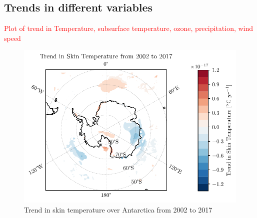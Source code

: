 \documentclass[../main.tex]{subfiles}
\begin{document}
\subsection{Trends in different variables}
\textcolor{red}{Plot of trend in Temperature, subsurface temperature, ozone, precipitation, wind speed}
\begin{figure}[!hbt]
    \centering
    \includegraphics{images/2021w5/chapter7/hres/trend_spatial_skt}
    \caption{Trend in skin temperature over Antarctica from 2002 to 2017}
    \label{fig:trend_skt_02_17}
\end{figure}
\end{document}

